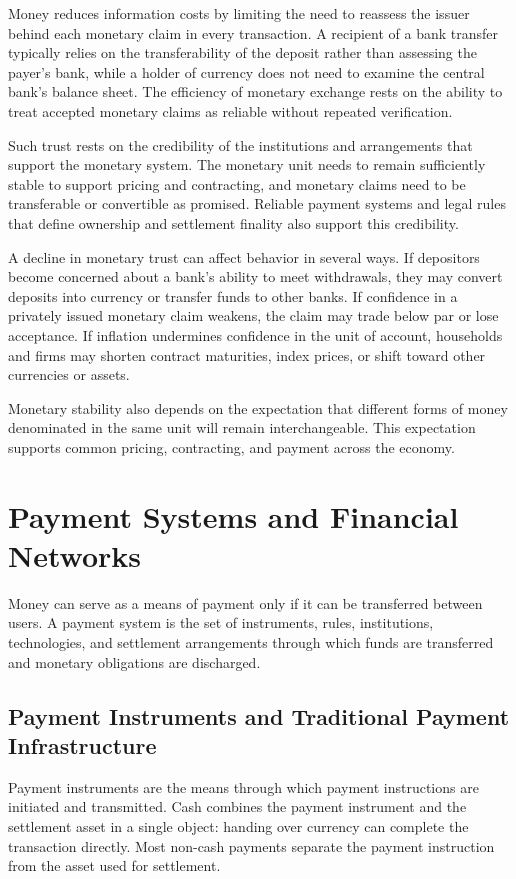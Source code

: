 Money reduces information costs by limiting the need to reassess the issuer behind each monetary claim in every transaction. A recipient of a bank transfer typically relies on the transferability of the deposit rather than assessing the payer's bank, while a holder of currency does not need to examine the central bank's balance sheet. The efficiency of monetary exchange rests on the ability to treat accepted monetary claims as reliable without repeated verification.

Such trust rests on the credibility of the institutions and arrangements that support the monetary system. The monetary unit needs to remain sufficiently stable to support pricing and contracting, and monetary claims need to be transferable or convertible as promised. Reliable payment systems and legal rules that define ownership and settlement finality also support this credibility.

A decline in monetary trust can affect behavior in several ways. If depositors become concerned about a bank's ability to meet withdrawals, they may convert deposits into currency or transfer funds to other banks. If confidence in a privately issued monetary claim weakens, the claim may trade below par or lose acceptance. If inflation undermines confidence in the unit of account, households and firms may shorten contract maturities, index prices, or shift toward other currencies or assets.

Monetary stability also depends on the expectation that different forms of money denominated in the same unit will remain interchangeable. This expectation supports common pricing, contracting, and payment across the economy.

\section{Payment Systems and Financial Networks}

Money can serve as a means of payment only if it can be transferred between users. A payment system is the set of instruments, rules, institutions, technologies, and settlement arrangements through which funds are transferred and monetary obligations are discharged.

\subsection{Payment Instruments and Traditional Payment Infrastructure}

Payment instruments are the means through which payment instructions are initiated and transmitted. Cash combines the payment instrument and the settlement asset in a single object: handing over currency can complete the transaction directly. Most non-cash payments separate the payment instruction from the asset used for settlement.

